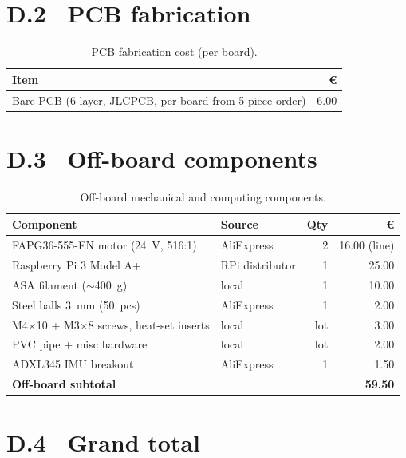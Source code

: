 \section*{D.2 \ PCB fabrication}

\begin{table}[H]
    \centering
    \begin{tabular}{lr}
        \toprule
        Item & \euro{} \\
        \midrule
        Bare PCB (6-layer, JLCPCB, per board from 5-piece order) & 6.00 \\
        \bottomrule
    \end{tabular}
    \caption{PCB fabrication cost (per board).}
\end{table}

\section*{D.3 \ Off-board components}

\begin{table}[H]
    \centering
    \begin{tabular}{llrr}
        \toprule
        Component & Source & Qty & \euro{} \\
        \midrule
        FAPG36-555-EN motor (24~V, 516:1) & AliExpress & 2 & 16.00 (line) \\
        Raspberry Pi 3 Model A+ & RPi distributor & 1 & 25.00 \\
        ASA filament ($\sim$400~g) & local & 1 & 10.00 \\
        Steel balls 3~mm (50~pcs) & AliExpress & 1 & 2.00 \\
        M4$\times$10 + M3$\times$8 screws, heat-set inserts & local & lot & 3.00 \\
        PVC pipe + misc hardware & local & lot & 2.00 \\
        ADXL345 IMU breakout & AliExpress & 1 & 1.50 \\
        \midrule
        \textbf{Off-board subtotal} & & & \textbf{59.50} \\
        \bottomrule
    \end{tabular}
    \caption{Off-board mechanical and computing components.}
\end{table}

\section*{D.4 \ Grand total}

